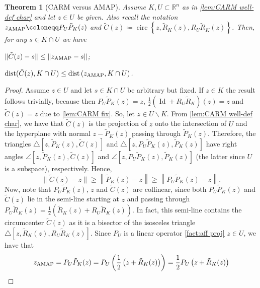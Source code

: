 \documentclass[smallextended,numbook,nospthms]{svjour3}
\theoremstyle{plain}
\newtheorem{theorem}{Theorem}[section]
\theoremstyle{definition}
\def\RR{\mathds R}
\DeclareMathOperator{\Id}{Id}
\DeclareMathOperator{\dist}{dist}
\DeclareMathOperator{\circum}{circ}
\newcommand{\AMAP}{{\rm AMAP}}
\begin{document}
\begin{theorem}[CARM versus AMAP]\label{thm:CARM x AMAP} Assume $K, U \subset \RR^{n}$ as in  \cref{lem:CARM well-def char} and let $z \in U$ be given. Also recall the notation $z_{\mathrm{\AMAP}}\coloneqq P_{U}\tilde{P}_{K}(z)$ and $\tilde{C}(z)\coloneqq \circum \left\{z, \tilde{R}_{K}(z), R_{U} \tilde{R}_{K}(z)\right\}$.
	Then, for any $s \in K \cap U$ we have
	\begin{listi}
		\item $\|\tilde{C}(z)-s\| \leq\left\|z_{\AMAP}-s\right\|$;
		\item $\dist(\tilde{C}(z), K \cap U) \leq \dist\left(z_{\mathrm{\AMAP}}, K \cap U\right)$.
	\end{listi}
\end{theorem}
\begin{proof}
	Assume $z \in U$ and let $s \in K \cap U$ be arbitrary but fixed. If $z \in K$ the result follows trivially, because then $P_{U} \tilde{P}_{K}(z)=z$, $\frac{1}{2}\left(\Id+R_{U} \tilde{R}_{K}\right)(z)=z$ and $\tilde{C}(z)=z$ due to  \cref{lem:CARM fix}. So, let $z \in U \backslash K$. From  \cref{lem:CARM well-def char}, we have that $\tilde{C}(z)$ is the projection of $z$ onto the intersection of $U$ and the hyperplane with normal $z-\tilde{P}_{K}(z)$ passing through $\tilde{P}_{K}(z)$. Therefore, the triangles $\triangle{[z, \tilde{P}_{K}(z), \tilde{C}(z)]}$ and $\triangle{[z, P_{U}\tilde{P}_{K}(z), \tilde{P}_{K}(z)]}$ have right angles $\angle{[z, \tilde{P}_{K}(z), \tilde{C}(z)]}$ and $\angle{[z,P_{U}\tilde{P}_{K}(z), \tilde{P}_{K}(z)]}$ (the latter since $U$ is a subspace), respectively. Hence,
	\begin{equation}\label{eq:myopic 1}
		\|\tilde{C}(z)-z\| \geq\left\|\tilde{P}_{K}(z)-z\right\| \geq\left\|P_{U}\tilde{P}_{K}(z)-z\right\|.	\end{equation}
	Now, note that $P_{U}\tilde{P}_{K}(z)$, $z$ and $\tilde{C}(z)$ are collinear, since both $P_{U} \tilde{P}_{K}(z)$ and $\tilde{C}(z)$ lie in the semi-line starting at $z$ and passing through $P_{U}\tilde{R}_{K}(z)=\frac{1}{2}\left(\tilde{R}_{K}(z)+R_{U}\tilde{R}_{K}(z)\right)$. In fact, this semi-line contains the circumcenter $\tilde{C}(z)$ as it is a bisector of the isosceles triangle $\triangle{[z, \tilde{R}_{K}(z),R_{U}\tilde{R}_{K}(z)]}$. Since $P_{U}$ is a linear operator \cref{fact:aff proj} $z \in U$, we have that
	\begin{align}
		z_{\mathrm{\AMAP}} &=P_{U} \tilde{P}_{K}(z)=P_{U}\left(\frac{1}{2}\left(z+\tilde{R}_{K}(z)\right)\right)=\frac{1}{2} P_{U}\left(z+\tilde{R}_{K}(z)\right) \\

\end{align}
\end{proof}
\end{document}

